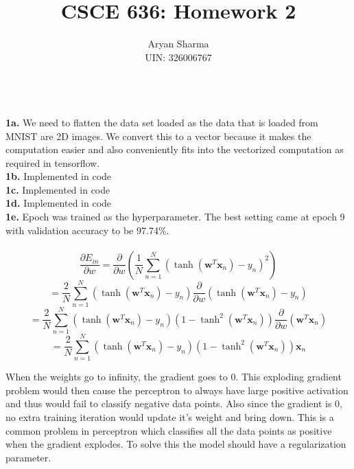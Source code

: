 \documentclass[letterpaper]{article}
\title{CSCE 636: Homework 2}
\author{Aryan Sharma\\UIN: 326006767} %
\date{} %
\begin{document}
	
\maketitle

\\

\noindent \textbf{1a.} 	We need to flatten the data set loaded as the data that is loaded from MNIST are 2D images. We convert this to a vector because it makes the computation easier and also conveniently fits into the vectorized computation as required in tensorflow. \\

\noindent \textbf{1b.} Implemented in code\\

\noindent \textbf{1c.} Implemented in code\\

\noindent \textbf{1d.} Implemented in code\\

\noindent \textbf{1e.} Epoch was trained as the hyperparameter. The best setting came at epoch 9 with validation accuracy to be 97.74\%. \\

\\

	\[
		\frac{\partial E_{in}}{\partial w} =  \frac{\partial}{\partial w} (\frac{1}{N} \sum_{n=1}^{N} (\tanh (\textbf{w}^T\textbf{x}_n) - y_n)^2)
	\]
	\[
		= \frac{2}{N} \sum_{n=1}^{N} (\tanh (\textbf{w}^T\textbf{x}_n) - y_n) \frac{\partial}{\partial w} (\tanh (\textbf{w}^T\textbf{x}_n) - y_n)
	\]
	\[
		= \frac{2}{N} \sum_{n=1}^{N} (\tanh (\textbf{w}^T\textbf{x}_n) - y_n) (1- \tanh^2 (\textbf{w}^T\textbf{x}_n)) \frac{\partial}{\partial w} (\textbf{w}^T\textbf{x}_n)
	\]
	\[
		= \frac{2}{N} \sum_{n=1}^{N} (\tanh (\textbf{w}^T\textbf{x}_n) - y_n) (1- \tanh^2 (\textbf{w}^T\textbf{x}_n)) \textbf{x}_n
	\]
	
	When the weights go to infinity, the gradient goes to 0. This exploding gradient problem would then cause the perceptron to always have large positive activation and thus would fail to classify negative data points. Also since the gradient is 0, no extra training iteration would update it's weight and bring down. This is a common problem in perceptron which classifies all the data points as positive when the gradient explodes. To solve this the model should have a regularization parameter. \\
\end{document}
